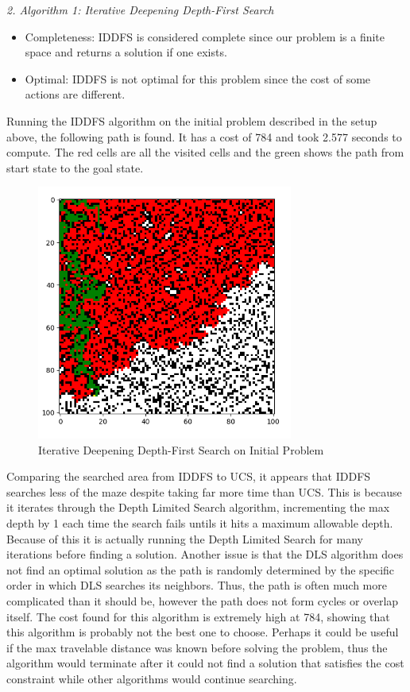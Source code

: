 \documentclass[a4paper]{article}
\begin{document}
\newpage

\textit{2. Algorithm 1: Iterative Deepening Depth-First Search}
\begin{itemize}
    \item Completeness: IDDFS is considered complete since our problem is a finite space and returns a solution if one exists.
    \item Optimal: IDDFS is not optimal for this problem since the cost of some actions are different.
\end{itemize}
Running the IDDFS algorithm on the initial problem described in the setup above, the following path is found. It has a cost of 784 and took 2.577 seconds to compute. The red cells are all the visited cells and the green shows the path from start state to the goal state.

\begin{figure}[ht]
    \centering
    \includegraphics[width=0.75\textwidth]{fig3.png}
    \caption{Iterative Deepening Depth-First Search on Initial Problem}
    \label{fig:IDDFS}
\end{figure}

Comparing the searched area from IDDFS to UCS, it appears that IDDFS searches less of the maze despite taking far more time than UCS. This is because it iterates through the Depth Limited Search algorithm, incrementing the max depth by 1 each time the search fails untils it hits a maximum allowable depth. Because of this it is actually running the Depth Limited Search for many iterations before finding a solution. Another issue is that the DLS algorithm does not find an optimal solution as the path is randomly determined by the specific order in which DLS searches its neighbors. Thus, the path is often much more complicated than it should be, however the path does not form cycles or overlap itself. The cost found for this algorithm is extremely high at 784, showing that this algorithm is probably not the best one to choose. Perhaps it could be useful if the max travelable distance was known before solving the problem, thus the algorithm would terminate after it could not find a solution that satisfies the cost constraint while other algorithms would continue searching.
\end{document}
